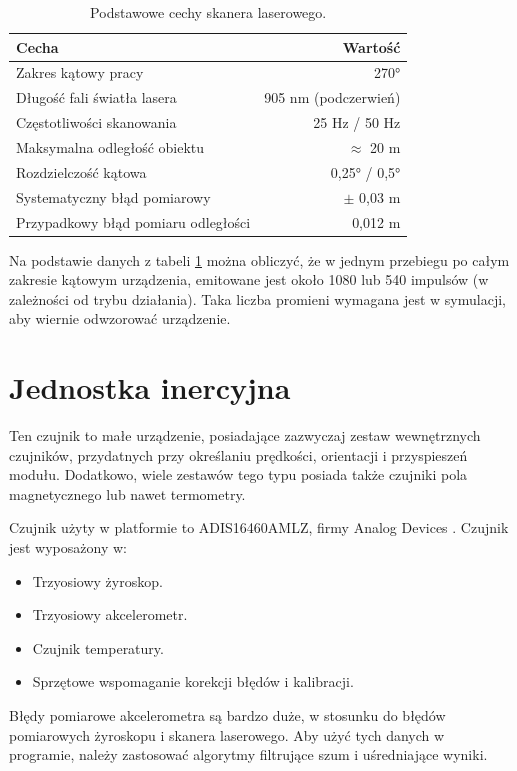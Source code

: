 		\begin{table}
			\centering
			\begin{tabular}{l r}
			Cecha & Wartość \\
			\hline
			Zakres kątowy pracy & \ang{270} \\
			Długość fali światła lasera & 905 \si{\nano\metre} (podczerwień) \\
			Częstotliwości skanowania & 25 \si{\hertz} / 50 \si{\hertz} \\
			Maksymalna odległość obiektu & $\approx$ 20 \si{\metre} \\
			Rozdzielczość kątowa & 0,25° / 0,5° \\
			Systematyczny błąd pomiarowy & $\pm$ 0,03 \si{\metre} \\
			Przypadkowy błąd pomiaru odległości & 0,012 \si{\metre} \\
			\end{tabular}
			\caption{Podstawowe cechy skanera laserowego.}
			\label{tab:lidar}
		\end{table}
		
		Na podstawie danych z tabeli \ref{tab:lidar} można obliczyć, że w jednym przebiegu po całym zakresie kątowym urządzenia, 
		emitowane jest około 1080 lub 540 impulsów (w zależności od trybu działania).
		Taka liczba promieni wymagana jest w symulacji, aby wiernie odwzorować urządzenie.

\section{Jednostka inercyjna}
	Ten czujnik to małe urządzenie, posiadające zazwyczaj zestaw wewnętrznych czujników, przydatnych przy określaniu prędkości, orientacji i przyspieszeń modułu.
	Dodatkowo, wiele zestawów tego typu posiada także czujniki pola magnetycznego lub nawet termometry.
	
	Czujnik użyty w platformie to ADIS16460AMLZ, firmy Analog Devices \cite{adis_website}.
	Czujnik jest wyposażony w:
	\begin{itemize}
		\item Trzyosiowy żyroskop.
		\item Trzyosiowy akcelerometr.
		\item Czujnik temperatury.
		\item Sprzętowe wspomaganie korekcji błędów i kalibracji.
	\end{itemize}
	
	Błędy pomiarowe akcelerometra są bardzo duże, w stosunku do błędów pomiarowych żyroskopu i skanera laserowego. 
	Aby użyć tych danych w programie, należy zastosować algorytmy filtrujące szum i uśredniające wyniki.
	
